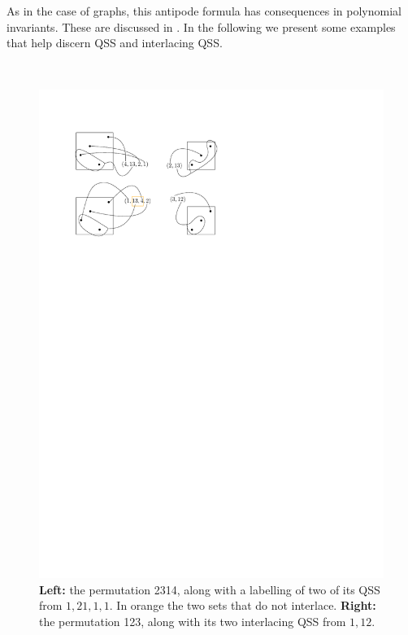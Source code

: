 \documentclass[12pt, reqno]{amsart}
\theoremstyle{definition}
\begin{document}
As in the case of graphs, this antipode formula has consequences in polynomial invariants.
These are discussed in \cite{penaguiao2023polynomial}.
In the following we present some examples that help discern QSS and interlacing QSS.

\


\begin{figure}[h]
    \centering
    \includegraphics{images/interlacing_25314.pdf}
    \caption{\textbf{Left:} the permutation 2314, along with a labelling of two of its QSS from $1, 21, 1, 1$. In orange the two sets that do not interlace. \textbf{Right:} the permutation 123, along with its two interlacing QSS from $1, 12$.\label{fig:interlacingQSSsmpl}}
\end{figure}
\end{document}
